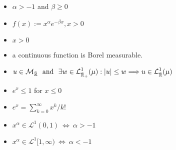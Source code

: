 \noindent\makebox[\linewidth]{\rule{\paperwidth}{0.4pt}}

\begin{minipage}[t]{0.46\textwidth}
\begin{given}
\begin{itemize}
\item \(\alpha >-1\) and \(\beta \geq 0\)
\item \(f(x):=x^\alpha e^{-\beta x},x>0\)
\end{itemize}
\end{given}

\begin{random}
\begin{itemize}
 \item \( x >0\)
\end{itemize}

\end{random}

\begin{tools}
\begin{itemize}
\item a continuous function is Borel measurable. 
\item \(\displaystyle
u\in \mathcal{M}_{\bar{\Bbb{R}}} \  \text{ and }\  \exists w\in \mathcal{L}^{1}_{\bar{\Bbb{R}}_{+}}(\mu ): |u|\leq w \\\Longrightarrow  u\in \mathcal{L}_{\bar{\Bbb{R}}}^1(\mu )
\)
\item \(e^x \leq 1 \) for $x\leq 0$
\item \(e^x = \sum_{k=0}^\infty x^k/k!\)
\item \(x^\alpha \in \mathcal{L}^1(0,1)\  \Longleftrightarrow \  \alpha >-1 \)
\item \(x^\alpha \in \mathcal{L}^1[1,\infty)\  \Longleftrightarrow \  \alpha <-1 \)
\end{itemize}
\end{tools}

\end{minipage}
